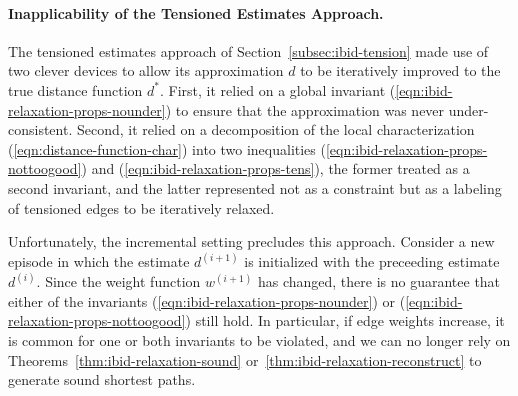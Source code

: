 \paragraph{Inapplicability of the Tensioned Estimates Approach.}
The tensioned estimates approach of Section~\ref{subsec:ibid-tension}
made use of two clever devices to allow its approximation $d$ to be
iteratively improved to the true distance function $d^*$.
First, it relied on a global invariant
(\ref{eqn:ibid-relaxation-props-nounder})
to ensure that the approximation was never under-consistent.
Second, it relied on a decomposition of the local characterization
(\ref{eqn:distance-function-char})
into two inequalities
(\ref{eqn:ibid-relaxation-props-nottoogood})
and (\ref{eqn:ibid-relaxation-props-tens}),
the former treated as a second invariant,
and the latter represented not as a constraint but as a labeling
of tensioned edges to be iteratively relaxed.

Unfortunately,
the incremental setting precludes this approach.
Consider a new episode in which the estimate $d^{(i+1)}$
is initialized with the preceeding estimate $d^{(i)}$.
Since the weight function $w^{(i+1)}$ has changed,
there is no guarantee that either of the invariants
(\ref{eqn:ibid-relaxation-props-nounder})
or (\ref{eqn:ibid-relaxation-props-nottoogood}) still hold.
In particular,
if edge weights increase,
it is common for one or both invariants to be violated,
and we can no longer rely on Theorems~\ref{thm:ibid-relaxation-sound}
or~\ref{thm:ibid-relaxation-reconstruct} to generate sound
shortest paths.

